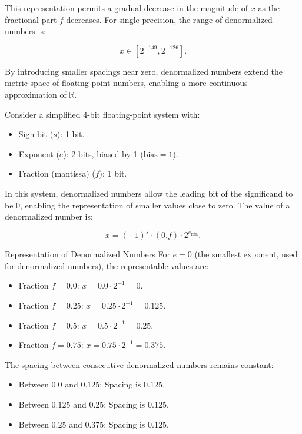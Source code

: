 This representation permits a gradual decrease in the magnitude of \( x \) as the fractional part \( f \) decreases. For single precision, the range of denormalized numbers is:

\[
x \in \left[ 2^{-149}, 2^{-126} \right].
\]

By introducing smaller spacings near zero, denormalized numbers extend the metric space of floating-point numbers, enabling a more continuous approximation of \( \mathbb{R} \).

Consider a simplified 4-bit floating-point system with:
\begin{itemize}
    \item Sign bit (\( s \)): 1 bit.
    \item Exponent (\( e \)): 2 bits, biased by 1 (\( \text{bias} = 1 \)).
    \item Fraction (mantissa) (\( f \)): 1 bit.
\end{itemize}

In this system, denormalized numbers allow the leading bit of the significand to be \( 0 \), enabling the representation of smaller values close to zero. The value of a denormalized number is:

\[
x = (-1)^s \cdot (0.f) \cdot 2^{e_{\text{min}}}.
\]

Representation of Denormalized Numbers
For \( e = 0 \) (the smallest exponent, used for denormalized numbers), the representable values are:

\begin{itemize}
    \item Fraction \( f = 0.0 \):
    \(
    x = 0.0 \cdot 2^{-1} = 0.
    \)

    \item Fraction \( f = 0.25 \):
    \(
    x = 0.25 \cdot 2^{-1} = 0.125.
    \)

    \item Fraction \( f = 0.5 \):
    \(
    x = 0.5 \cdot 2^{-1} = 0.25.
    \)

    \item Fraction \( f = 0.75 \):
    \(
    x = 0.75 \cdot 2^{-1} = 0.375.
    \)
\end{itemize}

\vspace{\baselineskip}\par
\noindent 
The spacing between consecutive denormalized numbers remains constant:
\begin{itemize}
    \item Between \( 0.0 \) and \( 0.125 \): Spacing is \( 0.125 \).
    \item Between \( 0.125 \) and \( 0.25 \): Spacing is \( 0.125 \).
    \item Between \( 0.25 \) and \( 0.375 \): Spacing is \( 0.125 \).
\end{itemize}

